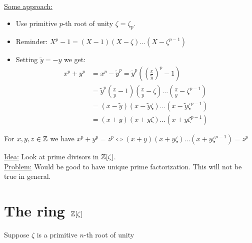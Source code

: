 \underline{Some approach:}
\begin{itemize}
\item Use primitive $p$-th root of unity $\zeta=\zeta_p$.
\item Reminder: $X^p-1=(X-1)(X-\zeta)\dots (X-\zeta^{p-1})$
\item Setting $\tilde{y}=-y$ we get:
\begin{align*}
x^p+y^p&= x^p-\tilde{y}^p=\tilde{y}^p( (\frac{x}{\tilde{y}})^p -1)\\
&=\tilde{y}^p (\frac{x}{\tilde{y}}-1)(\frac{x}{\tilde{y}}-\zeta)\dots(\frac{x}{\tilde{y}}-\zeta^{p-1})\\
&=(x-\tilde{y})(x-\tilde{y}\zeta)\dots (x-\tilde{y}\zeta^{p-1})\\
&=(x+y)(x+y\zeta)\dots (x+y\zeta^{p-1})
\end{align*}
\end{itemize}

\begin{Lem}
For $x,y,z \in \mathbb{Z}$ we have $x^p+y^p=z^p \iff (x+y)(x+y\zeta)\dots(x+y \zeta^{p-1})=z^p$
\end{Lem}

\underline{Idea:} Look at prime divisors in $\mathbb{Z}[\zeta]$.\\
\underline{Problem:} Would be good to have unique prime factorization. This will not be true in general.

\section{The ring $\mathbb{Z}[\zeta]$}
Suppose $\zeta$ is a primitive $n$-th root of unity

